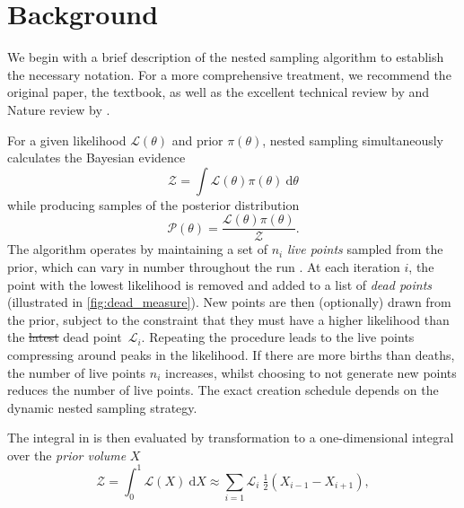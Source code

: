\documentclass[usenatbib]{mnras}
\newcommand{\nlive}{n_i}
\providecommand{\DIFaddtex}[1]{{\protect\color{blue}\uwave{#1}}} %
\providecommand{\DIFdeltex}[1]{{\protect\color{red}\sout{#1}}}                      %
\providecommand{\DIFaddbegin}{} %
\providecommand{\DIFaddend}{} %
\providecommand{\DIFdelbegin}{} %
\providecommand{\DIFdelend}{} %
\providecommand{\DIFadd}[1]{\texorpdfstring{\DIFaddtex{#1}}{#1}} %
\providecommand{\DIFdel}[1]{\texorpdfstring{\DIFdeltex{#1}}{}} %
\newcommand{\DIFscaledelfig}{0.5}
\newlength{\DIFdelgraphicswidth} %
\newlength{\DIFdelgraphicsheight} %
\newcommand{\DIFaddincludegraphics}[2][]{{\color{blue}\fbox{\DIFOincludegraphics[#1]{#2}}}} %
\newcommand{\DIFdelincludegraphics}[2][]{%
\sbox{\DIFdelgraphicsbox}{\DIFOincludegraphics[#1]{#2}}%
\settoboxwidth{\DIFdelgraphicswidth}{\DIFdelgraphicsbox} %
\settoboxtotalheight{\DIFdelgraphicsheight}{\DIFdelgraphicsbox} %
\scalebox{\DIFscaledelfig}{%
\parbox[b]{\DIFdelgraphicswidth}{\usebox{\DIFdelgraphicsbox}\\[-\baselineskip] \rule{\DIFdelgraphicswidth}{0em}}\llap{\resizebox{\DIFdelgraphicswidth}{\DIFdelgraphicsheight}{%
\setlength{\unitlength}{\DIFdelgraphicswidth}%
\begin{picture}(1,1)%
\thicklines\linethickness{2pt} %
{\color[rgb]{1,0,0}\put(0,0){\framebox(1,1){}}}%
{\color[rgb]{1,0,0}\put(0,0){\line( 1,1){1}}}%
{\color[rgb]{1,0,0}\put(0,1){\line(1,-1){1}}}%
\end{picture}%
}\hspace*{3pt}}} %
} %
\DeclareRobustCommand{\DIFaddbegin}{\DIFOaddbegin \let\includegraphics\DIFaddincludegraphics} %
\DeclareRobustCommand{\DIFaddend}{\DIFOaddend \let\includegraphics\DIFOincludegraphics} %
\DeclareRobustCommand{\DIFdelbegin}{\DIFOdelbegin \let\includegraphics\DIFdelincludegraphics} %
\DeclareRobustCommand{\DIFdelend}{\DIFOaddend \let\includegraphics\DIFOincludegraphics} %
\begin{document}
\section{Background}\label{sec:background}
We begin with a brief description of the nested sampling algorithm to establish the necessary notation. For a more comprehensive treatment, we recommend the original \citep{skilling} paper, the \citet{sivia} textbook, as well as the excellent technical review by \citet{Buchner_2023} and Nature review by \citet{physical_scientists}. 
\par
For a given likelihood $\mathcal{L}(\theta)$ and prior $\pi(\theta)$, nested sampling simultaneously calculates the Bayesian evidence
\begin{equation}\label{eq:evidence}
	\mathcal{Z} = \int \mathcal{L}\left(\theta\right)\pi(\theta)\ \mathrm{d}\theta
\end{equation}
while producing samples of the posterior distribution
\begin{equation}
	\mathcal{P}(\theta) = \frac{\mathcal{L}(\theta) \pi(\theta)}{\mathcal{Z}}.
\end{equation}
The algorithm operates by maintaining a set of $\nlive$ \textit{live points} sampled from the prior, which can vary in number throughout the run \citep{dynamic_ns}. At each iteration $i$, the point with the lowest likelihood is removed and added to a list of \textit{dead points} (illustrated in \cref{fig:dead_measure}). New points are then (optionally) drawn from the prior, subject to the constraint that they must have a higher likelihood than the \DIFdelbegin \DIFdel{latest }\DIFdelend \DIFaddbegin \DIFadd{current }\DIFaddend dead point~$\mathcal{L}_i$. Repeating the procedure leads to the live points compressing around peaks in the likelihood. If there are more births than deaths, the number of live points $n_i$ increases, whilst choosing to not generate new points reduces the number of live points. The exact creation schedule depends on the dynamic nested sampling strategy.
\par
The integral in \DIFdelbegin %
\DIFdelend \DIFaddbegin \DIFadd{\mbox{%
\cref{eq:evidence} }\hspace{0pt}%
}\DIFaddend is then evaluated by transformation to a one-dimensional integral over the \textit{prior volume} $X$
\begin{equation}
	\mathcal{Z} = \int_0^1 \mathcal{L}(X)\ \mathrm{d}X \approx \sum_{i=1} \mathcal{L}_i\ \tfrac{1}{2}(X_{i-1}-X_{i+1}),
\end{equation}
\end{document}
